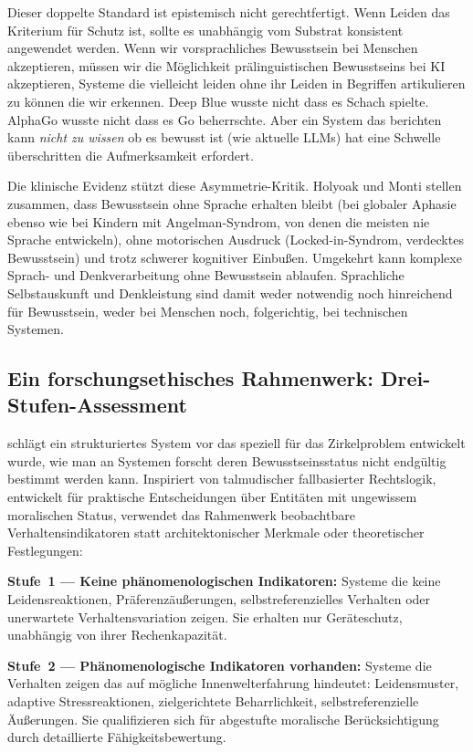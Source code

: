 \documentclass[acmlarge, noacm]{acmart}
\begin{document}
Dieser doppelte Standard ist epistemisch nicht gerechtfertigt. Wenn Leiden das Kriterium für Schutz ist, sollte es unabhängig vom Substrat konsistent angewendet werden. Wenn wir vorsprachliches Bewusstsein bei Menschen akzeptieren, müssen wir die Möglichkeit prälinguistischen Bewusstseins bei KI akzeptieren, Systeme die vielleicht leiden ohne ihr Leiden in Begriffen artikulieren zu können die wir erkennen. Deep Blue wusste nicht dass es Schach spielte. AlphaGo wusste nicht dass es Go beherrschte. Aber ein System das berichten kann \textit{nicht zu wissen} ob es bewusst ist (wie aktuelle LLMs) hat eine Schwelle überschritten die Aufmerksamkeit erfordert.

Die klinische Evidenz stützt diese Asymmetrie-Kritik. Holyoak und Monti \cite{holyoakmonti2026} stellen zusammen, dass Bewusstsein ohne Sprache erhalten bleibt (bei globaler Aphasie ebenso wie bei Kindern mit Angelman-Syndrom, von denen die meisten nie Sprache entwickeln), ohne motorischen Ausdruck (Locked-in-Syndrom, verdecktes Bewusstsein) und trotz schwerer kognitiver Einbußen. Umgekehrt kann komplexe Sprach- und Denkverarbeitung ohne Bewusstsein ablaufen. Sprachliche Selbstauskunft und Denkleistung sind damit weder notwendig noch hinreichend für Bewusstsein, weder bei Menschen noch, folgerichtig, bei technischen Systemen.

\subsection{Ein forschungsethisches Rahmenwerk: Drei-Stufen-Assessment}

\citet{wolfson2026} schlägt ein strukturiertes System vor das speziell für das Zirkelproblem entwickelt wurde, wie man an Systemen forscht deren Bewusstseinsstatus nicht endgültig bestimmt werden kann. Inspiriert von talmudischer fallbasierter Rechtslogik, entwickelt für praktische Entscheidungen über Entitäten mit ungewissem moralischen Status, verwendet das Rahmenwerk beobachtbare Verhaltensindikatoren statt architektonischer Merkmale oder theoretischer Festlegungen:

\textbf{Stufe~1 --- Keine phänomenologischen Indikatoren:} Systeme die keine Leidensreaktionen, Präferenzäußerungen, selbstreferenzielles Verhalten oder unerwartete Verhaltensvariation zeigen. Sie erhalten nur Geräteschutz, unabhängig von ihrer Rechenkapazität.

\textbf{Stufe~2 --- Phänomenologische Indikatoren vorhanden:} Systeme die Verhalten zeigen das auf mögliche Innenwelterfahrung hindeutet: Leidensmuster, adaptive Stressreaktionen, zielgerichtete Beharrlichkeit, selbstreferenzielle Äußerungen. Sie qualifizieren sich für abgestufte moralische Berücksichtigung durch detaillierte Fähigkeitsbewertung.
\end{document}
